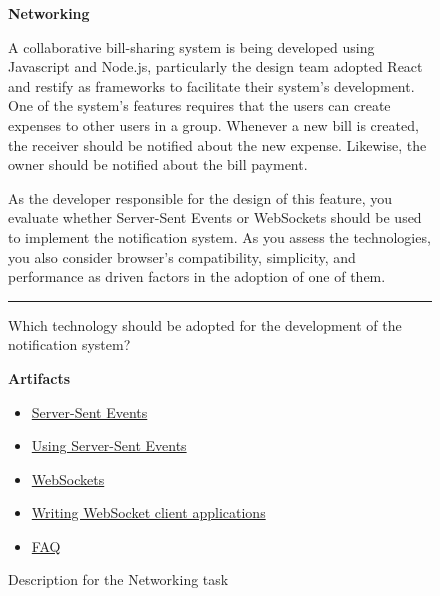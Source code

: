\begin{figure}
\begin{mdframed}[backgroundcolor=gray!05] 
\begin{scriptsize}

{\large \textbf{Networking}} \bigskip


A collaborative bill-sharing system is being developed using Javascript and Node.js, particularly the
design team adopted React and restify as frameworks to facilitate their system's development. One of the
system's features requires that the users can create expenses to other users in a group. Whenever a new
bill is created, the receiver should be notified about the new expense. Likewise, the owner should be
notified about the bill payment. \medskip

As the developer responsible for the design of this feature, you evaluate whether Server-Sent Events
or WebSockets should be used to implement the notification system. As you assess the technologies,
you also consider browser's compatibility, simplicity, and performance as driven factors in the adoption of
one of them.


\begin{center}
\rule{10cm}{0.4pt}
\end{center}

Which technology should be adopted for the development of the notification system?

\medskip

\textbf{Artifacts}

\begin{itemize}
    \item \href{https://developer.mozilla.org/en-US/docs/Web/API/EventSource}{Server-Sent Events}
    \item \href{https://developer.mozilla.org/en-US/docs/Web/API/Server-sent_events/Using_server-sent_events}{Using Server-Sent Events}
    \item \href{https://developer.mozilla.org/en-US/docs/Web/API/WebSockets_API}{WebSockets}
    \item \href{https://developer.mozilla.org/en-US/docs/Web/API/WebSockets_API/Writing_WebSocket_client_applications}{Writing WebSocket client applications}
    \item \href{https://stackoverflow.com/questions/5195452/websockets-vs-server-sent-events-eventsource}{FAQ}
\end{itemize}

\end{scriptsize}
\end{mdframed}
\caption{Description for the Networking task}
\end{figure}

    
